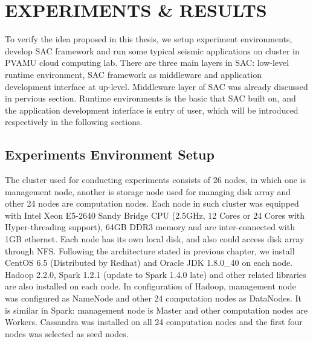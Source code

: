 %
%
%


\chapter{\uppercase{Experiments \& Results}}
To verify the idea proposed in this thesis, we setup experiment environments, develop SAC framework and run some typical seismic applications on cluster in PVAMU cloud computing lab. There are three main layers in SAC: low-level runtime environment, SAC framework as middleware and application development interface at up-level. Middleware layer of SAC was already discussed in pervious section. Runtime environments is the basic that SAC built on, and the application development interface is entry of user, which will be introduced respectively in the following sections.

\section{Experiments Environment Setup}

The cluster used for conducting experiments consists of 26 nodes, in which one is management node, another is storage node used for managing disk array and other 24 nodes are computation nodes. Each node in such cluster was equipped with Intel Xeon E5-2640 Sandy Bridge CPU (2.5GHz, 12 Cores or 24 Cores with Hyper-threading support), 64GB DDR3 memory and are inter-connected with 1GB ethernet. Each node has its own local disk, and also could access disk array through NFS. Following the architecture stated in previous chapter, we install CentOS 6.5 (Distributed by Redhat) and Oracle JDK 1.8.0\_40 on each node. Hadoop 2.2.0, Spark 1.2.1 (update to Spark 1.4.0 late) and other related libraries are also installed on each node. In configuration of Hadoop, management node was configured as NameNode and other 24 computation nodes as DataNodes. It is similar in Spark: management node is Master and other computation nodes are Workers. Cassandra was installed on all 24 computation nodes and the first four nodes was selected as seed nodes.

